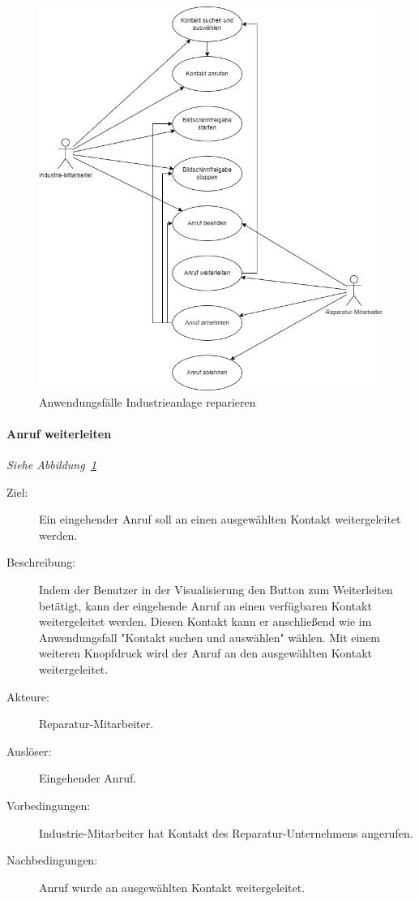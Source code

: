 \begin{figure}[ht!]
    \centering
    \includegraphics[width=\paperwidth-2in]{../assets/img/UML-Anwendungsfalldiagramme-Industrieanlage reparieren.drawio}
    \caption{Anwendungsfälle Industrieanlage reparieren}
    \label{fig:industrieanlage-reparieren}
\end{figure}

\paragraph{\large{Anruf weiterleiten}}
\textit{Siehe Abbildung~\ref{fig:industrieanlage-reparieren}}
    \begin{description}
        \item[Ziel:] Ein eingehender Anruf soll an einen ausgewählten Kontakt weitergeleitet werden.
        \item[Beschreibung:] Indem der Benutzer in der Visualisierung den Button zum Weiterleiten betätigt, kann der eingehende Anruf an einen verfügbaren Kontakt weitergeleitet werden.
            Diesen Kontakt kann er anschließend wie im Anwendungsfall "Kontakt suchen und auswählen" wählen.
            Mit einem weiteren Knopfdruck wird der Anruf an den ausgewählten Kontakt weitergeleitet.
        \item[Akteure:] Reparatur-Mitarbeiter.
        \item[Auslöser:] Eingehender Anruf.
        \item[Vorbedingungen:] Industrie-Mitarbeiter hat Kontakt des Reparatur-Unternehmens angerufen.
        \item[Nachbedingungen:] Anruf wurde an ausgewählten Kontakt weitergeleitet.
    \end{description}

